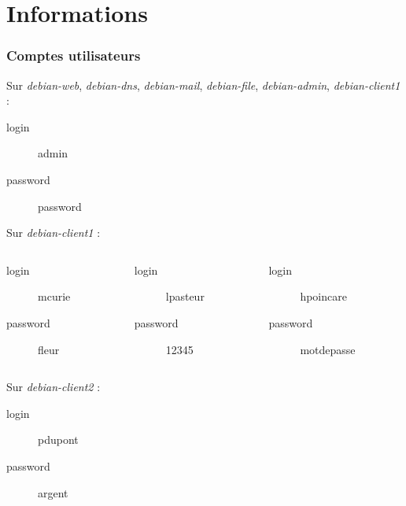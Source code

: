 \documentclass{beamer}
\begin{document}
	\section{Informations}
		\begin{frame}
			\frametitle{Comptes utilisateurs}
			\begin{alertblock}{Sur \textit{debian-web}, \textit{debian-dns}, \textit{debian-mail}, \textit{debian-file}, \textit{debian-admin}, \textit{debian-client1} :}
				\begin{description}
					\item[login] admin
					\item[password] password
				\end{description}
			\end{alertblock}
			\begin{alertblock}{Sur \textit{debian-client1} :}
				\begin{columns}
					\begin{column}{.28\linewidth}
						\begin{description}
							\item[login] mcurie
							\item[password] fleur
						\end{description}
					\end{column}
					\begin{column}{.29\linewidth}
						\begin{description}
							\item[login] lpasteur
							\item[password] 12345
						\end{description}
					\end{column}
					\begin{column}{.34\linewidth}
						\begin{description}
							\item[login] hpoincare
							\item[password] motdepasse
						\end{description}
					\end{column}
				\end{columns}
			\end{alertblock}
			\begin{alertblock}{Sur \textit{debian-client2} :}
				\begin{description}
					\item[login] pdupont
					\item[password] argent
				\end{description}
			\end{alertblock}
		\end{frame}
\end{document}
